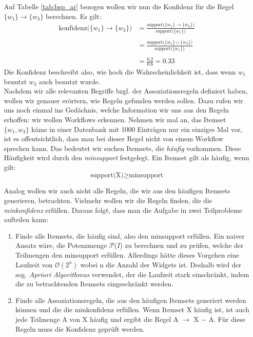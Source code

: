 Auf Tabelle \ref{tab:bsp_ar} bezogen wollen wir nun die Konfidenz für die Regel $\{w_1\} \rightarrow \{w_3\}$ berechnen. Es gilt:\\
\begin{align*}
	\text{konfidenz($\{w_1\} \rightarrow \{w_3\}$)} &= \frac{\text{support($\{w_1\} \rightarrow \{w_3\}$)}}{\text{support($\{w_1\}$)}}\\ \\
	&= \frac{\text{support($\{w_1\} \cup \{w_3\}$)}}{\text{support($\{w_1\}$)}}\\ \\
	&= \frac{0.2}{0.6} = 0.33
\end{align*}
Die Konfidenz beschreibt also, wie hoch die Wahrscheinlichkeit ist, dass wenn $w_1$ benutzt $w_3$ auch benutzt wurde. \citep{BeKe19}\\

Nachdem wir alle relevanten Begriffe bzgl. der Assoziationsregeln definiert haben, wollen wir genauer erörtern, wie Regeln gefunden werden sollen. Dazu rufen wir uns noch einmal ins Gedächnis, welche Information wir uns aus den Regeln erhoffen: wir wollen Workflows erkennen. Nehmen wir mal an, das Itemset $\{w_1,w_3\}$ käme in einer Datenbank mit 1000 Einträgen nur ein einziges Mal vor, ist es offentsichtlich, dass man bei dieser Regel nicht von einem Workflow sprechen kann. Das bedeutet wir suchen Itemsets, die \textit{häufig} vorkommen. Diese Häufigkeit wird durch den \textit{minsupport} festgelegt. Ein Itemset gilt als häufig, wenn gilt:\\
\begin{equation*}
	\text{support(X)} \geq \text{minsupport}
\end{equation*}

Analog wollen wir auch nicht alle Regeln, die wir aus den häufigen Itemsets generieren, betrachten. Vielmehr wollen wir die Regeln finden, die die \textit{minkonfidenz} erfüllen. Daraus folgt, dass man die Aufgabe in zwei Teilprobleme aufteilen kann:
\begin{enumerate}
	\item Finde alle Itemsets, die häufig sind, also den minsupport erfüllen. Ein naiver Ansatz wäre, die Potenzmenge $\mathcal{P}$($I$) zu berechnen und zu prüfen, welche der Teilmengen den minsupport erfüllen. Allerdings hätte dieses Vorgehen eine Laufzeit von $\mathcal{O}(2^n)$ wobei n die Anzahl der Widgets ist. Deshalb wird der sog. \textit{Apriori Algorithmus} verwendet, der die Laufzeit stark einschränkt, indem die zu betrachtenden Itemsets eingeschränkt werden.\\
	\item Finde alle Assoziationsregeln, die aus den häufigen Itemsets generiert werden können und die die minkonfidenz erfüllen. Wenn Itemset X häufig ist, ist auch jede Teilmenge A von X häufig und ergibt die Regel A $\rightarrow$ X $-$ A. Für diese Regeln muss die Konfidenz geprüft werden.
\end{enumerate}

